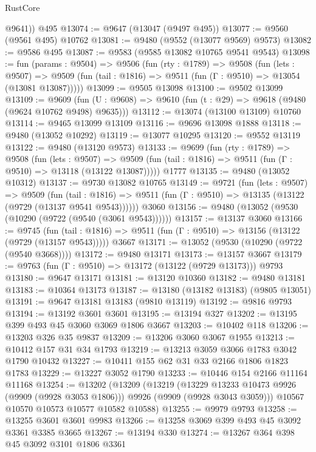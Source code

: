 \begin{lexlean}{RustCore}
\begin{coremodule}
        @9641))
    @495
@13074 := @9647 (@13047 (@9497 @495))
@13077 := @9560 (@9561 @495) @10762
@13081 := @9480 (@9552 (@13077 @9569) @9573)
@13082 := @9586 @495
@13087 := @9583 (@9585 @13082 @10765 @9541 @9543)
@13098 := fun (params : @9504) =>
  @9506
    (fun (rty : @1789) =>
    @9508
      (fun (lets : @9507) =>
      @9509 (fun (tail : @1816) => @9511 (fun (Γ : @9510) => @13054 (@13081 @13087)))))
@13099 := @9505 @13098
@13100 := @9502 @13099
@13109 := @9609
    (fun (U : @9608) => @9610 (fun (t : @29) => @9618 (@9480 (@9624 @10762 @9498) @9635)))
@13112 := @13074 (@13100 @13109) @10760
@13114 := @9465 @13099 @13109
@13116 := @9696 @13098 @1888
@13118 := @9480 (@13052 @10292)
@13119 := @13077 @10295
@13120 := @9552 @13119
@13122 := @9480 (@13120 @9573)
@13133 := @9699
    (fun (rty : @1789) =>
    @9508
      (fun (lets : @9507) =>
      @9509 (fun (tail : @1816) => @9511 (fun (Γ : @9510) => @13118 (@13122 @13087)))))
    @1777
@13135 := @9480 (@13052 @10312)
@13137 := @9730 @13082 @10765
@13149 := @9721
    (fun (lets : @9507) =>
    @9509
      (fun (tail : @1816) =>
      @9511 (fun (Γ : @9510) => @13135 (@13122 (@9729 (@13137 @9541 @9543))))))
    @3060
@13156 := @9480 (@13052 (@9530 (@10290 (@9722 (@9540 (@3061 @9543))))))
@13157 := @13137 @3060
@13166 := @9745
    (fun (tail : @1816) => @9511 (fun (Γ : @9510) => @13156 (@13122 (@9729 (@13157 @9543)))))
    @3667
@13171 := @13052 (@9530 (@10290 (@9722 (@9540 @3668))))
@13172 := @9480 @13171
@13173 := @13157 @3667
@13179 := @9763 (fun (Γ : @9510) => @13172 (@13122 (@9729 @13173))) @9793
@13180 := @9647 @13171
@13181 := @13120 @10360
@13182 := @9480 @13181
@13183 := @10364 @13173
@13187 := @13180 (@13182 @13183) (@9805 @13051)
@13191 := @9647 @13181 @13183 (@9810 @13119)
@13192 := @9816 @9793
@13194 := @13192 @3601 @3601
@13195 := @13194 @327
@13202 := @13195 @399 @493 @45 @3060 @3069 @1806 @3667
@13203 := @10402 @118
@13206 := @13203 @326 @35 @9837
@13209 := @13206 @3060 @3067 @1955
@13213 := @10412 @157 @31 @34 @1793
@13219 := @13213 @3059 @3066 @1783 @3042 @1790 @10432
@13227 := @10411 @155 @62 @31 @33 @2166 @1806 @1823 @1783
@13229 := @13227 @3052 @1790
@13233 := @10446 @154 @2166 @11164 @11168
@13254 := @13202
    (@13209
      (@13219
        (@13229 @13233 @10473 @9926 (@9909 (@9928 @3053 @1806)))
        @9926
        (@9909 (@9928 @3043 @3059)))
      @10567
      @10570
      @10573
      @10577
      @10582
      @10588)
@13255 := @9979 @9793
@13258 := @13255 @3601 @3601 @9983
@13266 := @13258 @3069 @399 @493 @45 @3092 @3361 @3385 @3665
@13267 := @13194 @330
@13274 := @13267 @364 @398 @45 @3092 @3101 @1806 @3361

\end{coremodule}
\end{lexlean}
